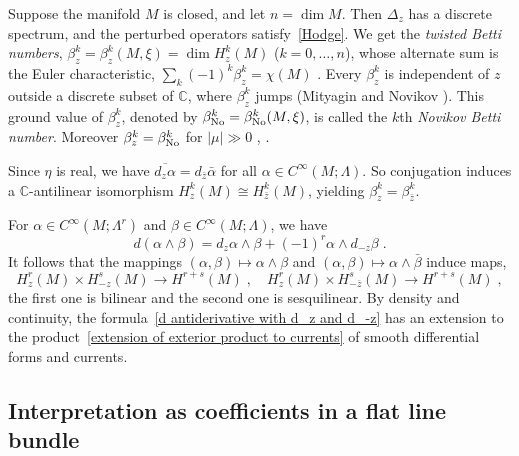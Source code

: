 \documentclass{memo-l}
\theoremstyle{plain}
\theoremstyle{definition}
\theoremstyle{remark}
\newcommand{\C}{\mathbb{C}}
\newcommand{\betaNo}{\beta_{\text{\rm No}}}
\numberwithin{section}{chapter}
\numberwithin{equation}{section}%
\begin{document}
Suppose the manifold $M$ is closed, and let $n=\dim M$. Then $\Delta_z$ has a discrete spectrum, and the perturbed operators satisfy~\eqref{Hodge}. We get the \emph{twisted Betti numbers}, $\beta_z^k=\beta_z^k(M,\xi)=\dim H_z^k(M)$ ($k=0,\dots,n$),  whose alternate sum is the Euler characteristic, $\sum_k(-1)^k\beta_z^k=\chi(M)$ \cite[Proposition~1.40]{Farber2004}. Every $\beta_z^k$ is independent of $z$ outside a discrete subset of $\C$, where $\beta_z^k$ jumps (Mityagin and Novikov \cite[Theorem~1]{Novikov2002}). This ground value of $\beta_z^k$, denoted by $\betaNo^k=\betaNo^k(M,\xi)$, is called the $k$th \emph{Novikov Betti number}. \index{$\betaNo^k$}  Moreover $\beta_z^k=\betaNo^k$ for $|\mu|\gg0$ \cite[Theorem~2.8]{Farber1995}, \cite[Lemma~1.3]{BravermanFarber1997} \cite[Eq.~(2.9)]{AlvKordyLeichtnam-ziomf}.

Since $\eta$ is real, we have $\overline{d_z\alpha}=d_{\bar z}\bar\alpha$ for all $\alpha\in C^\infty(M;\Lambda)$. So conjugation induces a $\C$-antilinear isomorphism $H_z^k(M)\cong H_{\bar z}^k(M)$, yielding $\beta_z^k=\beta_{\bar z}^k$.

For $\alpha\in C^\infty(M;\Lambda^r)$ and $\beta\in C^\infty(M;\Lambda)$, we have
\begin{equation}\label{d antiderivative with d_z and d_-z}
d(\alpha\wedge\beta)=d_z\alpha\wedge\beta+(-1)^r\alpha\wedge d_{-z}\beta\;.
\end{equation}
It follows that the mappings $(\alpha,\beta)\mapsto\alpha\wedge\beta$ and $(\alpha,\beta)\mapsto\alpha\wedge\bar\beta$ induce maps,
\begin{equation}\label{bilinear and sesquilinear maps}
H_z^r(M)\times H_{-z}^s(M) \to H^{r+s}(M)\;,\quad
H_z^r(M)\times H_{-\bar z}^s(M) \to H^{r+s}(M)\;,
\end{equation}
the first one is bilinear and the second one is sesquilinear.  By density and continuity, the formula~\eqref{d antiderivative with d_z and d_-z} has an extension to the product~\eqref{extension of exterior product to currents} of smooth differential forms and currents.


\subsection{Interpretation as coefficients in a flat line bundle}\label{ss: flat line bundle}
\end{document}
